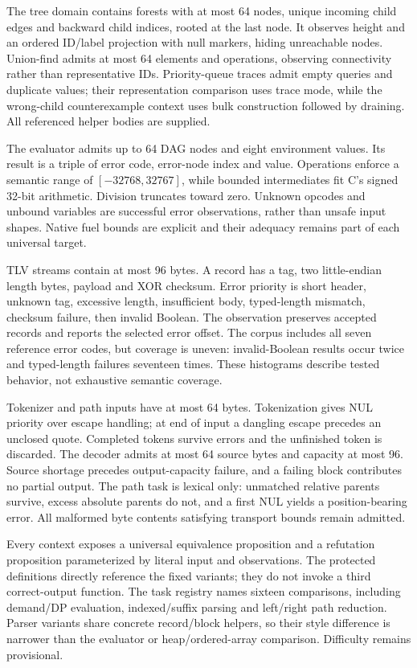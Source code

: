 \documentclass{article}
\begin{document}
The tree domain contains forests with at most 64 nodes, unique incoming child edges and backward child indices, rooted at the last node. It observes height and an ordered ID/label projection with null markers, hiding unreachable nodes. Union-find admits at most 64 elements and operations, observing connectivity rather than representative IDs. Priority-queue traces admit empty queries and duplicate values; their representation comparison uses trace mode, while the wrong-child counterexample context uses bulk construction followed by draining. All referenced helper bodies are supplied.

The evaluator admits up to 64 DAG nodes and eight environment values. Its result is a triple of error code, error-node index and value. Operations enforce a semantic range of $[-32768,32767]$, while bounded intermediates fit C's signed 32-bit arithmetic. Division truncates toward zero. Unknown opcodes and unbound variables are successful error observations, rather than unsafe input shapes. Native fuel bounds are explicit and their adequacy remains part of each universal target.

TLV streams contain at most 96 bytes. A record has a tag, two little-endian length bytes, payload and XOR checksum. Error priority is short header, unknown tag, excessive length, insufficient body, typed-length mismatch, checksum failure, then invalid Boolean. The observation preserves accepted records and reports the selected error offset. The corpus includes all seven reference error codes, but coverage is uneven: invalid-Boolean results occur twice and typed-length failures seventeen times. These histograms describe tested behavior, not exhaustive semantic coverage.

Tokenizer and path inputs have at most 64 bytes. Tokenization gives NUL priority over escape handling; at end of input a dangling escape precedes an unclosed quote. Completed tokens survive errors and the unfinished token is discarded. The decoder admits at most 64 source bytes and capacity at most 96. Source shortage precedes output-capacity failure, and a failing block contributes no partial output. The path task is lexical only: unmatched relative parents survive, excess absolute parents do not, and a first NUL yields a position-bearing error. All malformed byte contents satisfying transport bounds remain admitted.

Every context exposes a universal equivalence proposition and a refutation proposition parameterized by literal input and observations. The protected definitions directly reference the fixed variants; they do not invoke a third correct-output function. The task registry names sixteen comparisons, including demand/DP evaluation, indexed/suffix parsing and left/right path reduction. Parser variants share concrete record/block helpers, so their style difference is narrower than the evaluator or heap/ordered-array comparison. Difficulty remains provisional.
\end{document}
